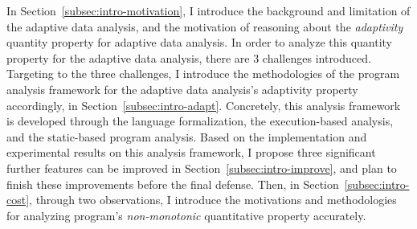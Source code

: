 In Section~\ref{subsec:intro-motivation},
I introduce the background and limitation of the 
adaptive data analysis, 
and the motivation of reasoning about the \emph{adaptivity} quantity property 
for adaptive data analysis.
In order to analyze this quantity property for the adaptive data analysis, there are 3 challenges
introduced.
Targeting to the three challenges, I introduce the methodologies 
of the program analysis framework for the adaptive data analysis's adaptivity property
accordingly, in Section~\ref{subsec:intro-adapt}.
Concretely, 
this analysis framework is developed through the language formalization,
the execution-based analysis, and the static-based program analysis.
%
Based on the implementation and experimental results on this analysis framework, 
I propose three significant 
further features can be improved 
in Section~\ref{subsec:intro-improve}, 
and plan to finish these improvements 
before the final defense.
%
 Then, in Section~\ref{subsec:intro-cost}, through two observations, 
 I introduce the motivations and methodologies
 for 
analyzing program's \emph{non-monotonic} quantitative property accurately.
